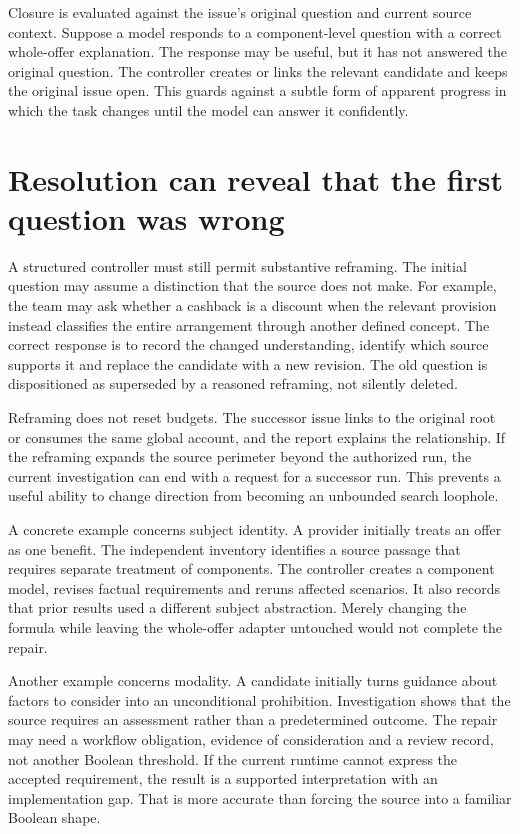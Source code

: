 \documentclass[12pt,a4paper,oneside,openany]{book}
\begin{document}
Closure is evaluated against the issue's original question and current source
context. Suppose a model responds to a component-level question with a correct
whole-offer explanation. The response may be useful, but it has not answered the
original question. The controller creates or links the relevant candidate and
keeps the original issue open. This guards against a subtle form of apparent
progress in which the task changes until the model can answer it confidently.

\section{Resolution can reveal that the first question was wrong}

A structured controller must still permit substantive reframing. The initial
question may assume a distinction that the source does not make. For example,
the team may ask whether a cashback is a discount when the relevant provision
instead classifies the entire arrangement through another defined concept.
The correct response is to record the changed understanding, identify which
source supports it and replace the candidate with a new revision. The old question
is dispositioned as superseded by a reasoned reframing, not silently deleted.

Reframing does not reset budgets. The successor issue links to the original root
or consumes the same global account, and the report explains the relationship.
If the reframing expands the source perimeter beyond the authorized run, the
current investigation can end with a request for a successor run. This prevents a
useful ability to change direction from becoming an unbounded search loophole.

A concrete example concerns subject identity. A provider initially treats an
offer as one benefit. The independent inventory identifies a source passage that
requires separate treatment of components. The controller creates a component
model, revises factual requirements and reruns affected scenarios. It also records
that prior results used a different subject abstraction. Merely changing the
formula while leaving the whole-offer adapter untouched would not complete the
repair.

Another example concerns modality. A candidate initially turns guidance about
factors to consider into an unconditional prohibition. Investigation shows that
the source requires an assessment rather than a predetermined outcome. The repair
may need a workflow obligation, evidence of consideration and a review record,
not another Boolean threshold. If the current runtime cannot express the accepted
requirement, the result is a supported interpretation with an implementation gap.
That is more accurate than forcing the source into a familiar Boolean shape.
\end{document}

